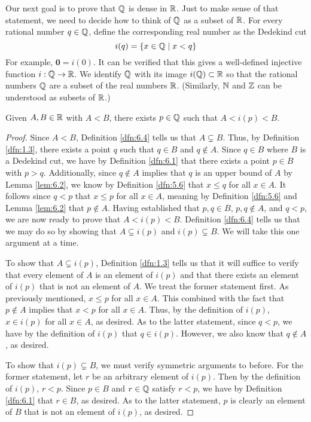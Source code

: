 \documentclass[../main.tex]{subfiles}
\begin{document}
Our next goal is to prove that $\mathbb{Q}$ is dense in $\mathbb{R}$. Just to make sense of that statement, we need to decide how to think of $\mathbb{Q}$ as a subset of $\mathbb{R}$. For every rational number $q\in\mathbb{Q}$, define the corresponding real number as the Dedekind cut
\begin{equation*}
    i(q) = \{x\in\mathbb{Q}\mid x<q\}
\end{equation*}
For example, $\bm{0}=i(0)$. It can be verified that this gives a well-defined injective function $i:\mathbb{Q}\to\mathbb{R}$. We identify $\mathbb{Q}$ with its image $i(\mathbb{Q})\subset\mathbb{R}$ so that the rational numbers $\mathbb{Q}$ are a subset of the real numbers $\mathbb{R}$. (Similarly, $\mathbb{N}$ and $\mathbb{Z}$ can be understood as subsets of $\mathbb{R}$.)

\begin{lemma}\label{lem:6.10}
    Given $A,B\in\mathbb{R}$ with $A<B$, there exists $p\in\mathbb{Q}$ such that $A<i(p)<B$.
    \begin{proof}
        Since $A<B$, Definition \ref{dfn:6.4} tells us that $A\subsetneq B$. Thus, by Definition \ref{dfn:1.3}, there exists a point $q$ such that $q\in B$ and $q\notin A$. Since $q\in B$ where $B$ is a Dedekind cut, we have by Definition \ref{dfn:6.1} that there exists a point $p\in B$ with $p>q$. Additionally, since $q\notin A$ implies that $q$ is an upper bound of $A$ by Lemma \ref{lem:6.2}, we know by Definition \ref{dfn:5.6} that $x\leq q$ for all $x\in A$. It follows since $q<p$ that $x\leq p$ for all $x\in A$, meaning by Definition \ref{dfn:5.6} and Lemma \ref{lem:6.2} that $p\notin A$. Having established that $p,q\in B$, $p,q\notin A$, and $q<p$, we are now ready to prove that $A<i(p)<B$. Definition \ref{dfn:6.4} tells us that we may do so by showing that $A\subsetneq i(p)$ and $i(p)\subsetneq B$. We will take this one argument at a time.\par
        To show that $A\subsetneq i(p)$, Definition \ref{dfn:1.3} tells us that it will suffice to verify that every element of $A$ is an element of $i(p)$ and that there exists an element of $i(p)$ that is not an element of $A$. We treat the former statement first. As previously mentioned, $x\leq p$ for all $x\in A$. This combined with the fact that $p\notin A$ implies that $x<p$ for all $x\in A$. Thus, by the definition of $i(p)$, $x\in i(p)$ for all $x\in A$, as desired. As to the latter statement, since $q<p$, we have by the definition of $i(p)$ that $q\in i(p)$. However, we also know that $q\notin A$, as desired.\par
        To show that $i(p)\subsetneq B$, we must verify symmetric arguments to before. For the former statement, let $r$ be an arbitrary element of $i(p)$. Then by the definition of $i(p)$, $r<p$. Since $p\in B$ and $r\in\mathbb{Q}$ satisfy $r<p$, we have by Definition \ref{dfn:6.1} that $r\in B$, as desired. As to the latter statement, $p$ is clearly an element of $B$ that is not an element of $i(p)$, as desired.
    \end{proof}
\end{lemma}
\end{document}
